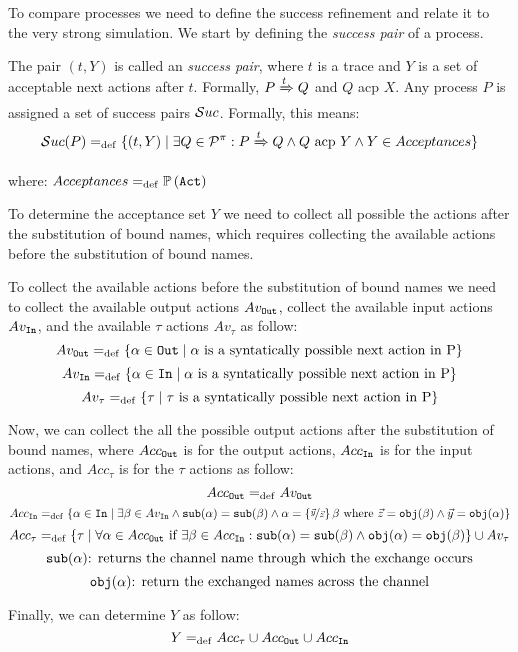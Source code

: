 To compare \picalc{} processes we need to define the success refinement and relate it to the very strong simulation. We start by defining the \textit{success pair} of a process.

The pair $(t, Y)$ is called an \textit{success pair}, where $t$ is a trace and $Y$ is a set of acceptable next actions after $t$. Formally, $P \xRightarrow{t} Q$ and $Q$ acp $X$. Any process
$P$ is assigned a set of success pairs $\Successes[]$. Formally, this means:
\begin{align}
    \Successes[P] \define \{(t,Y) \mid \exists Q\in\procs: P \bigstep{t} Q \wedge Q \text{ acp } Y \wedge Y\in Acceptances\}
\label{failure}
\end{align}

where: $Acceptances =_{\mathrm{def}} \mathbb P\left(\mathtt{Act}\right)$

To determine the acceptance set $Y$ we need to collect all possible the actions after the substitution of bound names, which requires collecting the available actions before the substitution of bound names.

To collect the available actions before the substitution of bound names we need to collect the available output actions $Av_{\mathtt{Out}}$, collect the available input actions $Av_{\mathtt{In}}$, and the available $\tau$ actions $Av_\tau$ as follow:
\[Av_{\mathtt{Out}}=_{\mathrm{def}}\{ \alpha \in \mathtt{Out} \mid \alpha\text{ is a syntatically possible next action in P}\}\]
\[Av_{\mathtt{In}}=_{\mathrm{def}}\{ \alpha \in \mathtt{In} \mid \alpha\text{ is a syntatically possible next action in P}\}\]
\[Av_\tau=_{\mathrm{def}}\{ \tau \mid \tau\text{ is a syntatically possible next action in P}\}\]

Now, we can collect the all the possible output actions after the substitution of bound names, where $Acc_{\mathtt{Out}}$ is for the output actions, $Acc_{\mathtt{In}}$ is for the input actions, and $Acc_\tau$ is for the $\tau$ actions as follow:
\[Acc_{\mathtt{Out}} =_{\mathrm{def}} Av_{\mathtt{Out}}\]
$Acc_{\mathtt{In}}=_{\mathrm{def}}\{\alpha \in \mathtt{In} \mid \exists \beta \in Av_{\mathtt{In}} \wedge \mathtt{sub}(\alpha)=\mathtt{sub}(\beta) \wedge \alpha=\left\{\nicefrac{\vec{y}}{\vec{z}}\right\}\beta \text{ where } \vec{z}=\mathtt{obj}(\beta) \wedge \vec{y}=\mathtt{obj}(\alpha) \}$
\[Acc_\tau=_{\mathrm{def}}\{\tau \mid \forall \alpha \in Acc_{\mathtt{Out}} \text{ if } \exists \beta \in Acc_{\mathtt{In}}  :\mathtt{sub}(\alpha)=\mathtt{sub}(\beta) \wedge \mathtt{obj}(\alpha)=\mathtt{obj}(\beta)  \}\cup Av_\tau\]
\[\mathtt{sub}(\alpha) \text{: returns the channel name through which the exchange occurs}\]
\[\mathtt{obj}(\alpha) \text{: return the exchanged names across the channel}\]

Finally, we can determine $Y$ as follow:
\[Y =_{\mathrm{def}} Acc_\tau \cup Acc_{\mathtt{Out}} \cup Acc_{\mathtt{In}}\]

